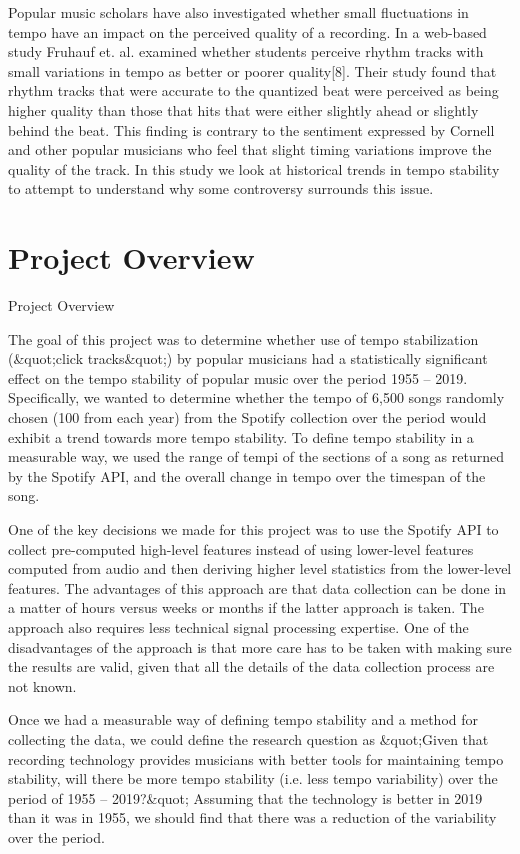 \documentclass{article}
\begin{document}
Popular music scholars have also investigated whether small fluctuations in tempo have an impact on the perceived quality of a recording.  In a web-based study Fruhauf et. al. examined whether students perceive rhythm tracks with small variations in tempo as better or poorer quality[8].  Their study found that rhythm tracks that were accurate to the quantized beat were perceived as being higher quality than those that hits that were either slightly ahead or slightly behind the beat.  This finding is contrary to the sentiment expressed by Cornell and other popular musicians who feel that slight timing variations improve the quality of the track.  In this study we look at historical trends in tempo stability to attempt to understand why some controversy surrounds this issue.

\section{Project Overview}
Project Overview

The goal of this project was to determine whether use of tempo stabilization (&quot;click tracks&quot;) by popular musicians had a statistically significant effect on the tempo stability of popular music over the period 1955 – 2019.  Specifically, we wanted to determine whether the tempo of 6,500 songs randomly chosen (100 from each year) from the Spotify collection over the period would exhibit a trend towards more tempo stability.  To define tempo stability in a measurable way, we used the range of tempi of the sections of a song as returned by the Spotify API, and the overall change in tempo over the timespan of the song.

One of the key decisions we made for this project was to use the Spotify API to collect pre-computed high-level features instead of using lower-level features computed from audio and then deriving higher level statistics from the lower-level features.  The advantages of this approach are that data collection can be done in a matter of hours versus weeks or months if the latter approach is taken.  The approach also requires less technical signal processing expertise.  One of the disadvantages of the approach is that more care has to be taken with making sure the results are valid, given that all the details of the data collection process are not known.

Once we had a measurable way of defining tempo stability and a method for collecting the data, we could define the research question as &quot;Given that recording technology provides musicians with better tools for maintaining tempo stability, will there be more tempo stability (i.e. less tempo variability) over the period of 1955 – 2019?&quot;  Assuming that the technology is better in 2019 than it was in 1955, we should find that there was a reduction of the variability over the period.
\end{document}
